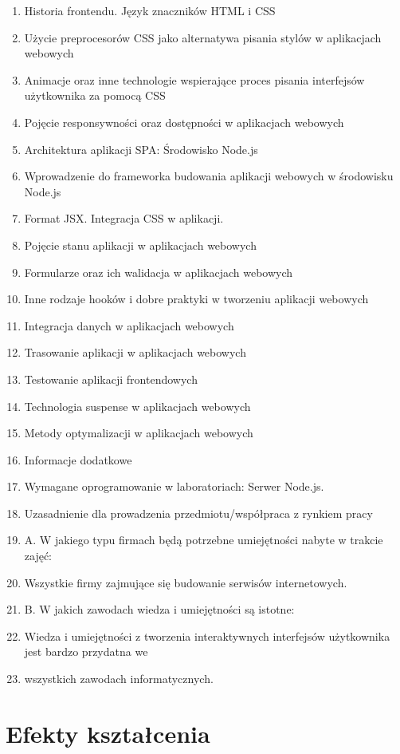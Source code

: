 \documentclass[12pt, a4paper]{article}
\begin{document}
\begin{enumerate}
  \item Historia frontendu. Język znaczników HTML i CSS
  \item Użycie preprocesorów CSS jako alternatywa pisania stylów w aplikacjach webowych
  \item Animacje oraz inne technologie wspierające proces pisania interfejsów użytkownika za pomocą CSS
  \item Pojęcie responsywności oraz dostępności w aplikacjach webowych
  \item Architektura aplikacji SPA: Środowisko Node.js
  \item Wprowadzenie do frameworka budowania aplikacji webowych w środowisku Node.js
  \item Format JSX. Integracja CSS w aplikacji.
  \item Pojęcie stanu aplikacji w aplikacjach webowych
  \item Formularze oraz ich walidacja w aplikacjach webowych
  \item Inne rodzaje hooków i dobre praktyki w tworzeniu aplikacji webowych
  \item Integracja danych w aplikacjach webowych
  \item Trasowanie aplikacji w aplikacjach webowych
  \item Testowanie aplikacji frontendowych
  \item Technologia suspense w aplikacjach webowych
  \item Metody optymalizacji w aplikacjach webowych
  \item Informacje dodatkowe
  \item Wymagane oprogramowanie w laboratoriach: Serwer Node.js.
  \item Uzasadnienie dla prowadzenia przedmiotu/współpraca z rynkiem pracy
  \item A. W jakiego typu firmach będą potrzebne umiejętności nabyte w trakcie zajęć:
  \item Wszystkie firmy zajmujące się budowanie serwisów internetowych.
  \item B. W jakich zawodach wiedza i umiejętności są istotne:
  \item Wiedza i umiejętności z tworzenia interaktywnych interfejsów użytkownika jest bardzo przydatna we
  \item wszystkich zawodach informatycznych.
\end{enumerate}

\section{Efekty kształcenia}
\end{document}
